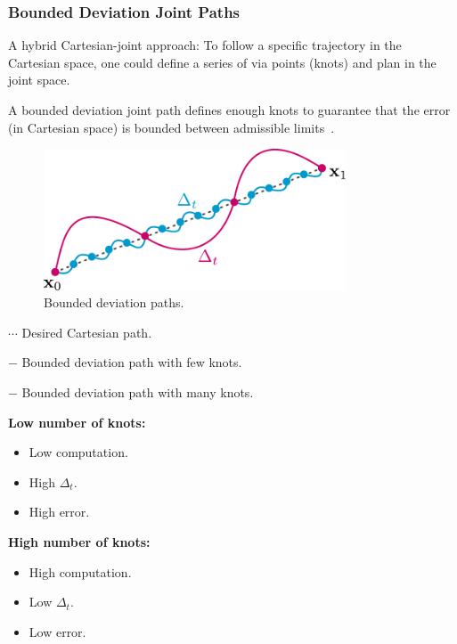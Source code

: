 \documentclass[10pt, aspectratio=169]{beamer}
\theoremstyle{remark}
\theoremstyle{definition}
\begin{document}
\begin{frame}[allowframebreaks]
\frametitle{Bounded Deviation Joint Paths}

A hybrid Cartesian-joint approach: To follow a specific trajectory in the Cartesian space, one could define a series of via points (knots) and plan in the joint space.

A bounded deviation joint path defines enough knots to guarantee that the error (in Cartesian space) is bounded between admissible limits~\cite{taylor1979planning}.

 \begin{center}
    \begin{minipage}{.5\linewidth}
    \begin{figure}
        \centering
        \includegraphics[width = 0.8\textwidth]{images/bounded_joint_path.pdf}
        \caption{Bounded deviation paths.}
    \end{figure}
    
    \begin{footnotesize}
        $\cdots$ Desired Cartesian path.
    
        \textcolor{uma_pink}{$-$ Bounded deviation path with few knots.}
    
        \textcolor{uma_blue_light}{$-$ Bounded deviation path with many knots.}    
    \end{footnotesize}
    
    \end{minipage}%
    \hspace{0.5cm}
    \begin{minipage}{.45\linewidth}
    \textcolor{uma_pink}{\textbf{Low number of knots:}}
        \begin{itemize}
            \item Low computation.
            \item High $\Delta_t$.
            \item High error.
        \end{itemize}
    \textcolor{uma_blue_light}{\textbf{High number of knots:}}
    \begin{itemize}
        \item High computation.
        \item Low $\Delta_t$.
        \item Low error.
    \end{itemize}
    \end{minipage}
\end{center}


\end{frame}
\end{document}
